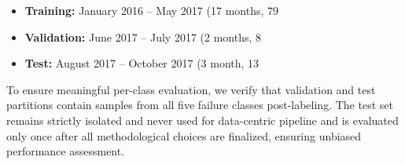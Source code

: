 \documentclass[12pt]{article}
\begin{document}
\begin{itemize}
\item \textbf{Training:} January 2016 – May 2017 (17 months, 79%
\item \textbf{Validation:} June 2017 – July 2017 (2 months, 8%
\item \textbf{Test:} August 2017 – October 2017 (3 month, 13%
\end{itemize}

To ensure meaningful per-class evaluation, we verify that validation and test partitions contain samples from all five failure classes post-labeling. The test set remains strictly isolated and never used for data-centric pipeline and is evaluated only once after all methodological choices are finalized, ensuring unbiased performance assessment.

\end{document}
